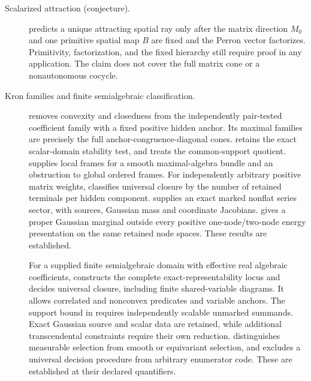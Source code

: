 \begin{description}
\item[Scalarized attraction (conjecture).]
 predicts a unique attracting spatial ray
only after the matrix direction \(M_0\) and one primitive spatial map \(B\)
are fixed and the Perron vector factorizes.  Primitivity, factorization, and
the fixed hierarchy still require proof in any application.  The claim does
not cover the full matrix cone or a nonautonomous cocycle.

\item[Kron families and finite semialgebraic classification.]
 removes convexity and
closedness from the independently pair-tested coefficient family with a
fixed positive hidden anchor. Its maximal families are precisely the full
anchor-congruence-diagonal cones. 
retains the exact scalar-domain stability test, and
 treats the common-support quotient.
 supplies local frames for a smooth
maximal-algebra bundle and an obstruction to global ordered frames.
For independently arbitrary positive matrix weights,
 classifies universal closure
by the number of retained terminals per hidden component.
 supplies an exact marked nonflat
series sector, with sources, Gaussian mass and coordinate Jacobians.
 gives a proper Gaussian
marginal outside every positive one-node/two-node energy presentation on
the same retained node spaces. These results are established.

For a supplied finite semialgebraic domain with effective real algebraic
coefficients,  constructs
the complete exact-representability locus and decides universal closure,
including finite shared-variable diagrams. It allows correlated and
nonconvex predicates and variable anchors. The support bound in
 requires independently
scalable unmarked summands. Exact Gaussian source and scalar data are
retained, while additional transcendental constraints require their own
reduction.  distinguishes measurable
selection from smooth or equivariant selection, and
 excludes a universal decision
procedure from arbitrary enumerator code. These are established at their
declared quantifiers. 


\end{description}
